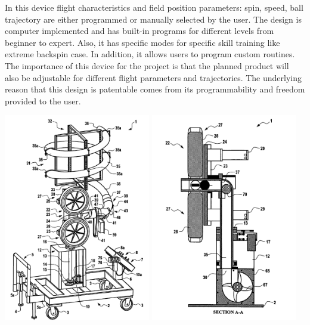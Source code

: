 \documentclass[12pt]{article}
\begin{document}
\begin{minipage}{0.6\textwidth}  %
    In this device flight characteristics and field position parameters: spin, speed, ball trajectory are either programmed or manually selected by the user. The design is computer implemented and has built-in programs for different levels from beginner to expert. Also, it has specific modes for specific skill training like extreme backspin case. In addition, it allows users to program custom routines. The importance of this device for the project is that the planned product will also be adjustable for different flight parameters and trajectories. The underlying reason that this design is patentable comes from its programmability and freedom provided to the user.
\end{minipage}%
\hfill
\begin{minipage}{0.38\textwidth}  %
    \centering
    \includegraphics[width=0.48\textwidth]{figures/patent4-1.png}  %
    \hfill
    \includegraphics[width=0.48\textwidth]{figures/patent4-2.png}  %
    \label{fig:patent4-1}
\end{minipage}
\end{document}
